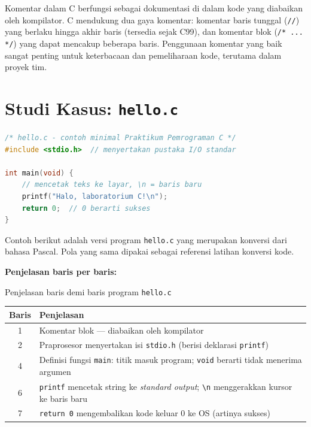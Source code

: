 \documentclass[../main.tex]{subfiles}
\begin{document}
Komentar dalam C berfungsi sebagai dokumentasi di dalam kode yang diabaikan oleh kompilator. C mendukung dua gaya komentar: komentar baris tunggal (\texttt{//}) yang berlaku hingga akhir baris (tersedia sejak C99), dan komentar blok (\texttt{/* ... */}) yang dapat mencakup beberapa baris. Penggunaan komentar yang baik sangat penting untuk keterbacaan dan pemeliharaan kode, terutama dalam proyek tim.

\section{Studi Kasus: \texttt{hello.c}}

\begin{lstlisting}[language=C,caption={\texttt{contoh\_code/c/hello.c} --- Program pertama}]
/* hello.c - contoh minimal Praktikum Pemrograman C */
#include <stdio.h>  // menyertakan pustaka I/O standar

int main(void) {
    // mencetak teks ke layar, \n = baris baru
    printf("Halo, laboratorium C!\n");
    return 0;  // 0 berarti sukses
}
\end{lstlisting}

\begin{catatan}
Contoh berikut adalah versi program \texttt{hello.c} yang merupakan konversi dari bahasa Pascal. Pola yang sama dipakai sebagai referensi latihan konversi kode.
\end{catatan}



\textbf{Penjelasan baris per baris:}

\begin{modultable}[]{Penjelasan baris demi baris program \texttt{hello.c}}
\begin{tabular}{|c|p{11cm}|}
\hline
\textbf{Baris} & \textbf{Penjelasan} \\
\hline
1 & Komentar blok --- diabaikan oleh kompilator \\
\hline
2 & Praprosesor menyertakan isi \texttt{stdio.h} (berisi deklarasi \texttt{printf}) \\
\hline
4 & Definisi fungsi \texttt{main}: titik masuk program; \texttt{void} berarti tidak menerima argumen \\
\hline
6 & \texttt{printf} mencetak string ke \textit{standard output}; \texttt{\textbackslash n} menggerakkan kursor ke baris baru \\
\hline
7 & \texttt{return 0} mengembalikan kode keluar 0 ke OS (artinya sukses) \\
\hline
\end{tabular}
\end{modultable}
\end{document}
